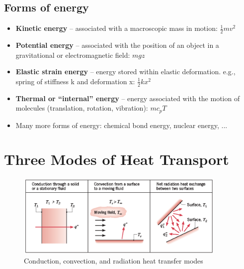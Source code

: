 \documentclass[12pt, a4paper]{article}
\begin{document}
\subsection{Forms of energy}
\begin{itemize}
    \item \textbf{Kinetic energy} – associated with a macroscopic mass in motion: $\frac{1}{2} mv^{2}$
    \item \textbf{Potential energy} – associated with the position of an object in a gravitational or electromagnetic field: $mgz$
    \item \textbf{Elastic strain energy} – energy stored within elastic deformation. e.g., spring of stiffness k and deformation x: $\frac{1}{2} k x^{2}$
    \item \textbf{Thermal or “internal” energy} – energy associated with the motion of molecules (translation, rotation, vibration): $mc_{p}T$
    \item Many more forms of energy: chemical bond energy, nuclear energy, ...
\end{itemize}

\section{Three Modes of Heat Transport}
\begin{figure}[H]
    \centering
    \includegraphics[width = 0.9\textwidth]{img/modes_of_heat_transport.eps}
    \caption{Conduction, convection, and radiation heat transfer modes}
\end{figure}
\end{document}
